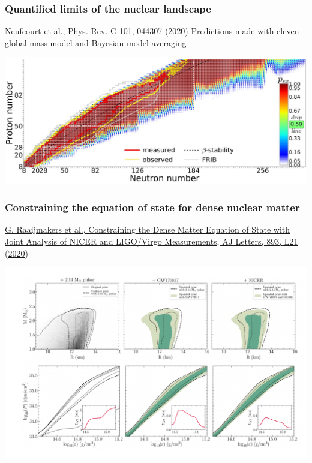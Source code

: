 \documentclass{beamer}
\begin{document}
\begin{frame}
\frametitle{Quantified limits of the nuclear landscape}

\href{{https://journals.aps.org/prc/abstract/10.1103/PhysRevC.101.044307}}{Neufcourt et al., Phys. Rev. C 101, 044307 (2020)}
Predictions made with eleven global mass model and Bayesian model averaging

\vspace{6mm}

\centerline{\includegraphics[width=1.0\linewidth]{figures/landscape.jpg}}

\vspace{6mm}
\end{frame}

\begin{frame}
\frametitle{Constraining the equation of state for dense nuclear matter}

\href{{https://iopscience.iop.org/article/10.3847/2041-8213/ab822f}}{G. Raaijmakers et al., Constraining the Dense Matter Equation of State with Joint Analysis of NICER and LIGO/Virgo Measurements, AJ Letters, 893, L21 (2020)}

\vspace{6mm}

\centerline{\includegraphics[width=1.0\linewidth]{figures/nstareos.png}}

\vspace{6mm}
\end{frame}
\end{document}
